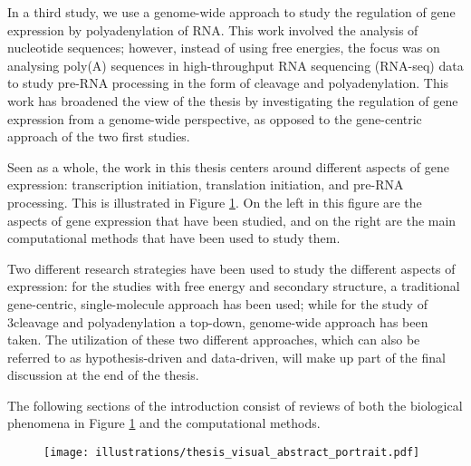 In a third study, we use a genome-wide approach to study the regulation of gene
expression by polyadenylation of RNA. This work involved the analysis of
nucleotide sequences; however, instead of using free energies, the focus was on
analysing poly(A) sequences in high-throughput RNA sequencing (RNA-seq) data to
study pre-RNA processing in the form of cleavage and polyadenylation. This work
has broadened the view of the thesis by investigating the regulation of gene
expression from a genome-wide perspective, as opposed to the gene-centric
approach of the two first studies.

Seen as a whole, the work in this thesis centers around different aspects of
gene expression: transcription initiation, translation initiation, and pre-RNA
processing. This is illustrated in Figure \ref{fig:thesis_visual}. On the left
in this figure are the aspects of gene expression that have been studied, and
on the right are the main computational methods that have been used to study
them.

Two different research strategies have been used to study the different aspects
of expression: for the studies with free energy and secondary structure, a
traditional gene-centric, single-molecule approach has been used; while for the
study of 3\ppp cleavage and polyadenylation a top-down, genome-wide approach
has been taken. The utilization of these two different approaches, which can
also be referred to as hypothesis-driven and data-driven, will make up part of
the final discussion at the end of the thesis.

The following sections of the introduction consist of reviews of both the
biological phenomena in Figure \ref{fig:thesis_visual} and the computational
methods.

\begin{figure}[htb]
	\begin{center}
		\texttt{[image: illustrations/thesis\_visual\_abstract\_portrait.pdf]}
	\end{center}
	\caption{}
	\label{fig:thesis_visual}
\end{figure}
